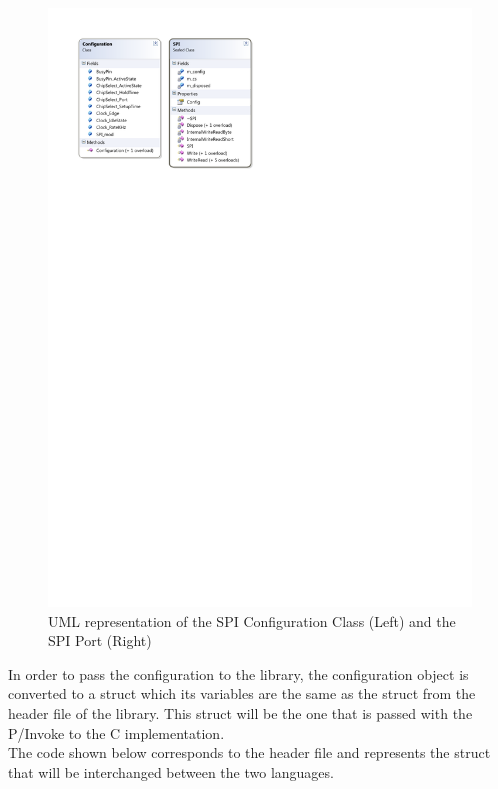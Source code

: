 \begin{figure}[H]\begin{center}
 \centering
  \captionsetup{justification=centering}
  \includegraphics[scale=1]{pictures/iosharp/spi-uml}
  \caption{UML representation of the SPI Configuration Class (Left) and the SPI Port (Right) \label{fig:spi-uml}}
\end{center}\end{figure}

In order to pass the configuration to the library, the configuration object is converted to a struct which its variables are the same as the struct from the header file of the library. This struct will be the one that is passed with the P/Invoke to the C implementation.
\\
The code shown below corresponds to the header file and represents the struct that will be interchanged between the two languages.

